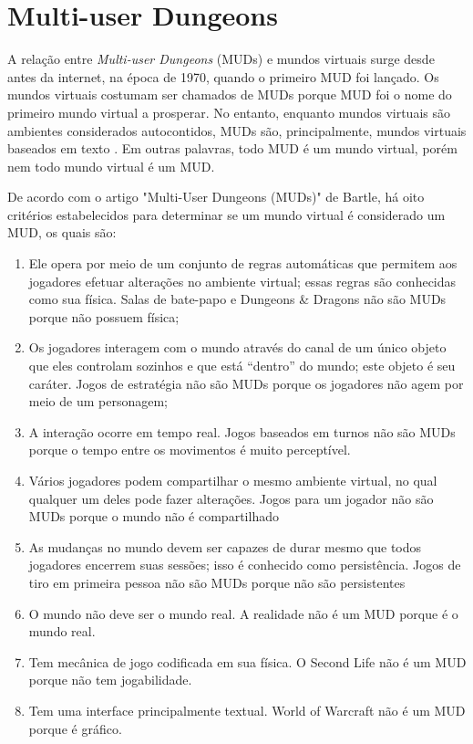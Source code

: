 \section{Multi-user Dungeons}

A relação entre \textit{Multi-user Dungeons} (MUDs) e mundos virtuais surge desde antes da internet, 
na época de 1970, quando o primeiro MUD foi lançado. Os mundos virtuais costumam ser chamados de MUDs 
porque MUD foi o nome do primeiro mundo virtual a prosperar. No entanto, enquanto mundos virtuais são 
ambientes considerados autocontidos, MUDs são, principalmente, mundos virtuais baseados em texto \cite{bartle2004designing,bartle2015multi}. 
Em outras palavras, todo MUD é um mundo virtual, porém nem todo mundo virtual é um MUD.

De acordo com o artigo "Multi-User Dungeons (MUDs)" de Bartle, há oito critérios estabelecidos para 
determinar se um mundo virtual é considerado um MUD, os quais são:

\begin{enumerate}
    \item Ele opera por meio de um conjunto de regras automáticas que permitem aos jogadores efetuar 
    alterações no ambiente virtual; essas regras são conhecidas como sua física. Salas de bate-papo e 
    Dungeons \& Dragons não são MUDs porque não possuem física;
    \item Os jogadores interagem com o mundo através do canal de um único objeto que eles controlam 
    sozinhos e que está “dentro” do mundo; este objeto é seu caráter. Jogos de estratégia não são MUDs 
    porque os jogadores não agem por meio de um personagem;
    \item A interação ocorre em tempo real. Jogos baseados em turnos não são MUDs porque o tempo entre 
    os movimentos é muito perceptível.
    \item Vários jogadores podem compartilhar o mesmo ambiente virtual, no qual qualquer um deles pode 
    fazer alterações. Jogos para um jogador não são MUDs porque o mundo não é compartilhado
    \item As mudanças no mundo devem ser capazes de durar mesmo que todos jogadores encerrem suas 
    sessões; isso é conhecido como persistência. Jogos de tiro em primeira pessoa não são MUDs porque 
    não são persistentes
    \item O mundo não deve ser o mundo real. A realidade não é um MUD porque é o mundo real.
    \item Tem mecânica de jogo codificada em sua física. O Second Life não é um MUD porque não tem jogabilidade.
    \item Tem uma interface principalmente textual. World of Warcraft não é um MUD porque é gráfico.
\end{enumerate}

